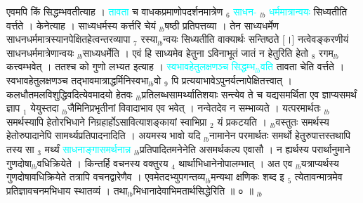 \documentclass[article,12pt,a4paper]{memoir}%
\newcommand{\quotelemma}[1]{\textcolor{cyan}{#1}}
\newcounter{parCount}
\begin{document}
	  
	  \pstart \leavevmode%
	\hphantom{.}एवमपि किं सिद्धम्भवतीत्याह । \quotelemma{तावता} च वाधकप्रमाणोपदर्शनमात्रेण {\tiny $_{6}$} \quotelemma{साधन-} {\tiny $_{lb}$} \leavevmode{} \quotelemma{धर्ममात्रान्वयः} \cite[1b8]{vn-msN} सिध्यतीति वर्त्तते । केनेत्याह । साध्यधर्मस्य कर्त्तरि चेयं {\tiny $_{lb}$}षष्ठी प्रतिपत्तव्या । तेन साध्यधर्मेण साधनधर्ममात्रस्यानपेक्षितहेत्वन्तरव्यापा {\tiny $_{7}$} रस्या{\tiny $_{lb}$}न्वयः सिध्यतीति वाक्यार्थः सन्तिष्ठते [।] नत्वेवङ्करणीयं साधनधर्ममात्रेणान्वयः {\tiny $_{lb}$}साध्यधर्मेति । एवं हि साध्यमेव हेतुना ऽविनाभूतं जातं न हेतुरिति हेतो {\tiny $_{8}$} रगम{\tiny $_{lb}$}कत्त्वम्भवेत् । ततश्च को गुणो लभ्यत इत्याह । \quotelemma{स्वभावहेतुलक्षणञ्च सिद्धम्भ{\tiny $_{lb}$}वति} \cite[1b9]{vn-msN} तावता चेति वर्त्तते । स्वभावहेतुलक्षणञ्च तद्भावमात्राद्धर्मिनिस्वभा{\tiny $_{lb}$}वो {\tiny $_{9}$} \leavevmode{} पि प्रत्ययाभावेऽपुनर्यत्नापेक्षितत्त्वात् । कलधौतमलविशुद्धिवदित्येवमादयो हेतवः {\tiny $_{lb}$}प्रतिलब्धसामर्थ्यातिशयाः सन्त्येव ते च यद्यसमर्थिता एव ज्ञाप्यसमर्थं ज्ञाप {\tiny $_{1}$} येयुस्तदा {\tiny $_{lb}$}जैमिनिप्रभृतीनां विवादाभाव एव भवेत् । नन्वेतदेव न सम्भाव्यते । यत्परमार्थतः {\tiny $_{lb}$}समर्थस्यापि हेतोरभिधाने निग्रहार्होऽसावित्याशङ्कायां स्वाभिप्रा {\tiny $_{2}$} यं प्रकटयति । {\tiny $_{lb}$}वस्तुतः समर्थस्य हेतोरुपादानेपि सामर्थ्यप्रतिपादनादिति । अयमस्य भावो यदि {\tiny $_{lb}$}नामानेन परमार्थतः समर्थो हेतुरुपात्तस्तथापि तस्य सा {\tiny $_{3}$} मर्थ्यं \quotelemma{साधनाङ्गासमर्थनान्न} {\tiny $_{lb}$}प्रतिपादितमनेनेति असमर्थकल्प एवासौ । न ह्यर्थस्य परार्थानुमाने गुणदोषा{\tiny $_{lb}$}वधिक्रियेते । किन्तर्हि वचनस्य वक्तुरय {\tiny $_{4}$} थार्थाभिधानेनोपालम्भात् । अत एव {\tiny $_{lb}$}यत्राप्यर्थस्य गुणदोषावधिक्रियेते तत्रापि वचनद्वारेणैव । एवमेतदभ्युपगन्तव्य{\tiny $_{lb}$}मन्यथा क्षणिकः शब्द इ {\tiny $_{5}$} त्येतावन्मात्रमेव प्रतिज्ञावचनमभिधाय स्थातव्यं । तथा{\tiny $_{lb}$}भिधानादेवाभिमतार्थसिद्धेरिति ॥ ० ॥
	{}
	\pend%
      {\tiny $_{lb}$}
\end{document}
